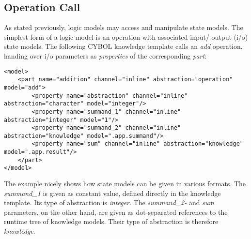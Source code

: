 %
%
%
%
%
%

\subsection{Operation Call}
\label{operation_call_heading}

As stated previously, logic models may access and manipulate state models. The
simplest form of a logic model is an operation with associated input/ output
(i/o) state models. The following CYBOL knowledge template calls an \emph{add}
operation, handing over i/o parameters as \emph{properties} of the
corresponding \emph{part}:

\begin{scriptsize}
    \begin{verbatim}
<model>
    <part name="addition" channel="inline" abstraction="operation" model="add">
        <property name="abstraction" channel="inline" abstraction="character" model="integer"/>
        <property name="summand_1" channel="inline" abstraction="integer" model="1"/>
        <property name="summand_2" channel="inline" abstraction="knowledge" model=".app.summand"/>
        <property name="sum" channel="inline" abstraction="knowledge" model=".app.result"/>
    </part>
</model>
    \end{verbatim}
\end{scriptsize}

The example nicely shows how state models can be given in various formats. The
\emph{summand\_1} is given as constant value, defined directly in the knowledge
template. Its type of abstraction is \emph{integer}. The \emph{summand\_2-} and
\emph{sum} parameters, on the other hand, are given as dot-separated references
to the runtime tree of knowledge models. Their type of abstraction is therefore
\emph{knowledge}.
